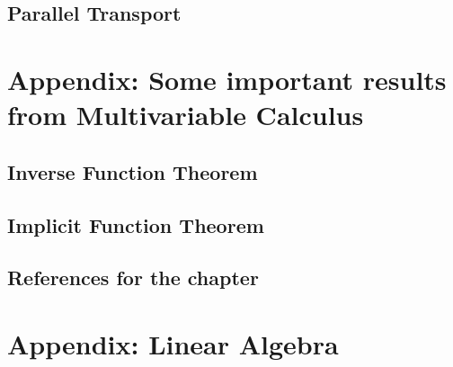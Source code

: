 \documentclass[11pt]{article}
\begin{document}



\subsection{Parallel Transport}





\newpage
\section{Appendix: Some important results from Multivariable Calculus}

\subsection{Inverse Function Theorem}


\subsection{Implicit Function Theorem}

\vskip 1cm
\subsection*{References for the chapter}



\newpage
\section{Appendix: Linear Algebra}
\end{document}
